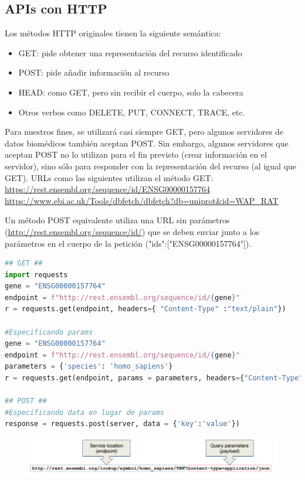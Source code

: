 \subsection{APIs con HTTP}
Los métodos HTTP originales tienen la siguiente semántica:
\begin{itemize}
\item GET: pide obtener una representación del recurso identificado
\item POST: pide añadir información al recurso
\item HEAD: como GET, pero sin recibir el cuerpo, solo la cabecera
\item Otros verbos como DELETE, PUT, CONNECT, TRACE, etc.
\end{itemize}

Para nuestros fines, se utilizará casi siempre GET, pero algunos servidores de datos biomédicos también aceptan POST. Sin embargo, algunos servidores que aceptan POST no lo utilizan para el fin previsto (crear información en el servidor), sino sólo para responder con la representación del recurso (al igual que GET).
URLs como las siguientes utilizan el método GET: \\
\href{https://rest.ensembl.org/sequence/id/ENSG00000157764}{https://rest.ensembl.org/sequence/id/ENSG00000157764} \\
\href{https://www.ebi.ac.uk/Tools/dbfetch/dbfetch?db=uniprot\&id=WAP\_RAT}{https://www.ebi.ac.uk/Tools/dbfetch/dbfetch?db=uniprot\&id=WAP\_RAT}

Un método POST equivalente utiliza una URL sin parámetros (\href{http://rest.ensembl.org/sequence/id/}{http://rest.ensembl.org/sequence/id/}) que se deben enviar junto a los parámetros en el cuerpo de la petición ({"ids":["ENSG00000157764"]}).
\begin{lstlisting}[language=Python]
## GET ##
import requests
gene = "ENSG00000157764"
endpoint = f"http://rest.ensembl.org/sequence/id/{gene}"
r = requests.get(endpoint, headers={ "Content-Type" :"text/plain"})

#Especificando params
gene = "ENSG00000157764"
endpoint = f"http://rest.ensembl.org/sequence/id/{gene}"
parameters = {'species': 'homo_sapiens'}
r = requests.get(endpoint, params = parameters, headers={"Content-Type" : "text/json"})

## POST ##
#Especificando data en lugar de params
response = requests.post(server, data = {'key':'value'})
\end{lstlisting}

\begin{figure}[htbp]
\centering
\includegraphics[width = \textwidth]{figs/rest-request.png}
\end{figure}

